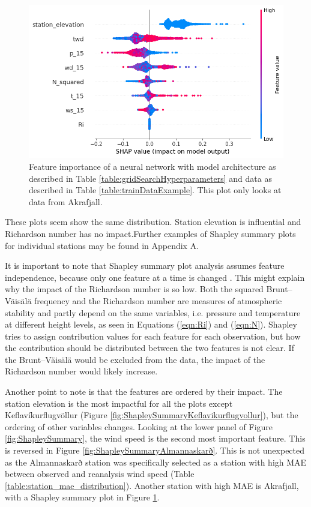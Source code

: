 \begin{figure}
    \centering
    \includegraphics[scale = 0.6]{Figures/shap_plots/summary_plot_31572.png}
    \caption[Shapley Summary plot at Akrafjall.]{Feature importance of a neural network with model architecture as described in Table \ref{table:gridSearchHyperparameters} and data as described in Table \ref{table:trainDataExample}. This plot only looks at data from Akrafjall.}
    \label{fig:ShapleySummaryAkrafjall}
\end{figure}

These plots seem show the same distribution. Station elevation is influential and Richardson number has no impact.Further examples of Shapley summary plots for individual stations may be found in Appendix A.

It is important to note that Shapley summary plot analysis assumes feature independence, because only one feature at a time is changed \parencite{Salih_2024}. This might explain why the impact of the Richardson number is so low. Both the squared Brunt–Väisälä frequency and the Richardson number are measures of atmospheric stability and partly depend on the same variables, i.e. pressure and temperature at different height levels, as seen in Equations (\ref{eqn:Ri}) and (\ref{eqn:N}). Shapley tries to assign contribution values for each feature for each observation, but how the contribution should be distributed between the two features is not clear. If the Brunt–Väisälä would be excluded from the data, the impact of the Richardson number would likely increase.

Another point to note is that the features are ordered by their impact. The station elevation is the most impactful for all the plots except Keflavíkurflugvöllur (Figure \ref{fig:ShapleySummaryKeflavikurflugvollur}), but the ordering of other variables changes. Looking at the lower panel of Figure \ref{fig:ShapleySummary}, the wind speed is the second most important feature. This is reversed in Figure \ref{fig:ShapleySummaryAlmannaskarð}. This is not unexpected as the Almannaskarð station was specifically selected as a station with high MAE between observed and reanalysis wind speed (Table \ref{table:station_mae_distribution}). Another station with high MAE is Akrafjall, with a Shapley summary plot in Figure \ref{fig:ShapleySummaryAkrafjall}.

